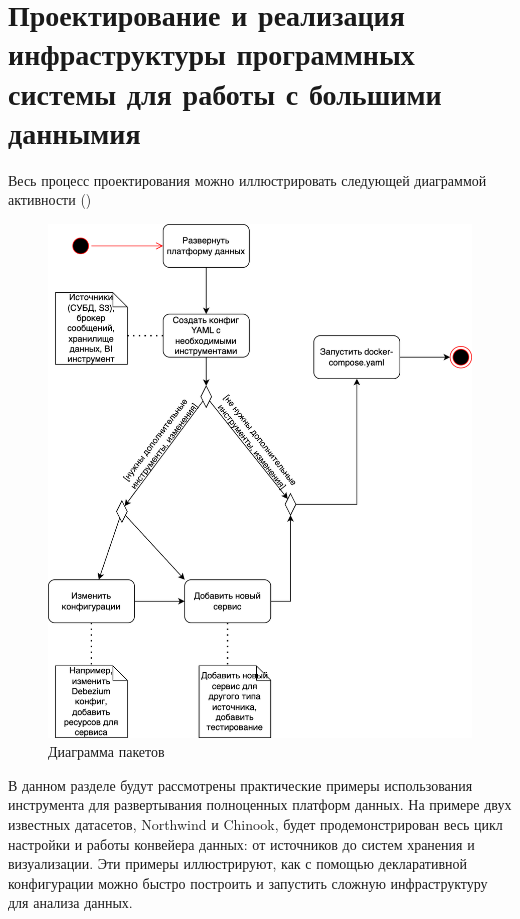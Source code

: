 \chapter{Проектирование и реализация инфраструктуры программных системы для работы с большими даннымия} \label{ch4}


Весь процесс проектирования можно иллюстрировать следующей диаграммой активности ()

\begin{figure}
    \center
    \includegraphics [scale=0.4] {my_folder/images/diagram_activity}
    \caption{Диаграмма пакетов}
    \label{fig:diagram_activity}
\end{figure}
\FloatBarrier
В данном разделе будут рассмотрены практические примеры использования инструмента для развертывания полноценных платформ данных. На примере двух известных датасетов, Northwind и Chinook, будет продемонстрирован весь цикл настройки и работы конвейера данных: от источников до систем хранения и визуализации. Эти примеры иллюстрируют, как с помощью декларативной конфигурации можно быстро построить и запустить сложную инфраструктуру для анализа данных.



